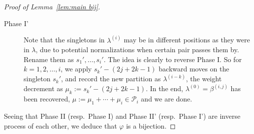 \documentclass[11pt,reqno]{amsart}
\numberwithin{equation}{section}
\theoremstyle{plain}
\theoremstyle{definition}
\def\la{\lambda}
\renewcommand{\P}{\mathcal{P}}
\begin{document}
\begin{proof}[Proof of Lemma~\ref{lem:main bij}]
\begin{description}
  \item[Phase I'] Note that the singletons in $\la^{(i)}$ may be in different positions as they were in $\la$, due to potential normalizations when certain pair passes them by. Rename them as $s_1',\ldots,s_i'$. The idea is clearly to reverse Phase I. So for $k=1,2,\ldots,i$, we apply $s_k'-(2j+2k-1)$ backward moves on the singleton $s_k'$, and record the new partition as $\la^{(i-k)}$, the weight decrement as $\mu_k:=s_k'-(2j+2k-1)$. In the end, $\la^{(0)}=\beta^{(i,j)}$ has been recovered, $\mu:=\mu_1+\cdots+\mu_i\in\P_i$ and we are done.
\end{description}
Seeing that Phase II (resp.~Phase I) and Phase II' (resp.~Phase I') are inverse process of each other, we deduce that $\varphi$ is a bijection.
\end{proof}
\end{document}
